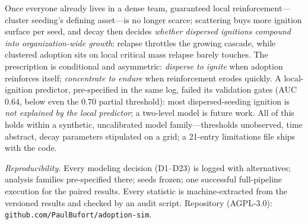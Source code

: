 \documentclass{llncs}
\begin{document}
Once everyone already lives in a dense team, guaranteed local
reinforcement---cluster seeding's defining asset---is no longer scarce;
scattering buys more ignition surface per seed, and decay then decides
\emph{whether dispersed ignitions compound into organization-wide growth}:
relapse throttles the growing cascade, while clustered adoption sits on
local critical mass relapse barely touches. The prescription is conditional
and asymmetric: \emph{disperse to ignite} when
adoption reinforces itself; \emph{concentrate to endure} when reinforcement
erodes quickly. A local-ignition predictor,
pre-specified in the same log, failed its validation gates (AUC
$0.64$, below even the $0.70$ partial threshold): most dispersed-seeding
ignition is \emph{not explained by the local predictor}; a two-level model
is future work. All of this holds within a synthetic, uncalibrated
model family---thresholds unobserved, time abstract, decay parameters
stipulated on a grid; a 21-entry limitations file ships with the
code.

\vspace{-4pt}
\emph{Reproducibility.} Every modeling decision (D1--D23) is logged with
alternatives; analysis families pre-specified there; seeds frozen; one
successful full-pipeline execution for the paired results. Every statistic
is machine-extracted from the versioned results and checked by an audit
script. Repository (AGPL-3.0): \texttt{github.com/PaulBufort/adoption-sim}.


\vspace{-18pt}

\end{document}
